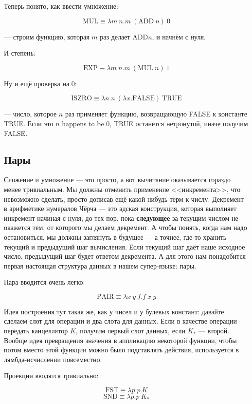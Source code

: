 \documentclass[a5paper]{article}
\begin{document}
Теперь понято, как ввести умножение:

$$\mbox{MUL} \equiv \lambda m\ n.m\ (\mbox{ADD}\ n)\ 0$$

--- строим функцию, которая $m$ раз делает $\mbox{ADD} n$, и начнём с нуля.

И степень:

$$\mbox{EXP} \equiv \lambda m\ n.m\ (\mbox{MUL}\ n)\ 1$$

Ну и ещё проверка на 0:

$$\mbox{ISZRO} \equiv \lambda n.n\ (\lambda x.\mbox{FALSE})\ \mbox{TRUE}$$

--- число, которое $n$ раз применяет функцию, возвращающую FALSE к константе TRUE. Если это $n$ happens to be 0, TRUE останется нетронутой, иначе получим FALSE.

\subsection{Пары}

Сложение и умножение --- это просто, а вот вычитание оказывается гораздо менее тривиальным. Мы должны отменить применение <<инкремента>>, что невозможно сделать, просто дописав ещё какой-нибудь терм к числу. Декремент в арифметике нумералов Чёрча --- это адская конструкция, которая выполняет инкремент начиная с нуля, до тех пор, пока \textbf{следующее} за текущим числом не окажется тем, от которого мы делаем декремент. А чтобы понять, когда нам надо остановиться, мы должны заглянуть в будущее --- а точнее, где-то хранить текущий и предыдущий шаг вычисления. Если текущий шаг даёт наше исходное число, предыдущий шаг будет ответом декремента. А для этого нам понадобится первая настоящая структура данных в нашем супер-языке: пары.

Пара вводится очень легко: 

$$\mbox{PAIR} \equiv \lambda x\ y\ f.f\ x\ y$$

Идея построения тут такая же, как у чисел и у булевых констант: давайте сделаем слот для операции и два слота для данных. Если в качестве операции передать канцеллятор $K$, получим первый слот данных, если $K_\ast$ --- второй. Вообще идея превращения значения в аппликацию некоторой функции, чтобы потом вместо этой функции можно было подставлять действия,  используется в лямбда-исчислении повсеместно.

Проекции вводятся тривиально:

$$\mbox{FST} \equiv \lambda p.p\ K$$
$$\mbox{SND} \equiv \lambda p.p\ K_\ast$$
\end{document}
